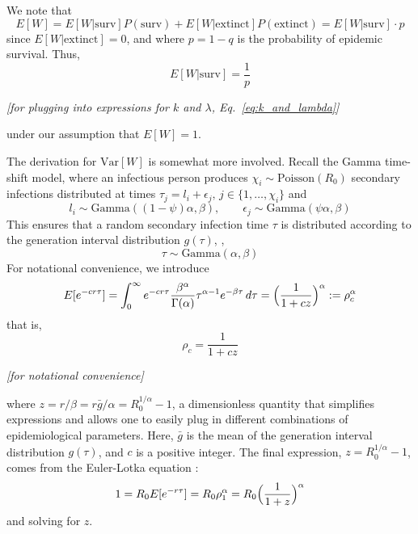  We note that 
\begin{equation}
E[W] = E[W|\text{surv}] P(\text{surv}) + E[W|\text{extinct}] P(\text{extinct}) = E[W | \text{surv}] \cdot p
\label{eq:p_explanation}
\end{equation}
since $E[W|\text{extinct}] = 0$, and where $p = 1-q$ is the probability of epidemic survival. Thus,
\begin{equation}
\boxed{E[W|\text{surv}] = \frac{1}{p}}
\end{equation}
\begin{center}
{\it [for plugging into expressions for $k$ and $\lambda$, Eq.~\ref{eq:k_and_lambda}]} \\ 
\end{center} 
under our assumption that $E[W] = 1$. 

 The derivation for $\text{Var}[W]$ is somewhat more involved. Recall the Gamma time-shift model, where an infectious person produces $\chi_i \sim \text{Poisson}(R_0)$ secondary infections distributed at times $\tau_j = l_i+ \epsilon_j,\, j\in \{1, \dots, \chi_i\}$ and 
\begin{equation}
l_i \sim \text{Gamma}((1-\psi) \alpha, \beta), \qquad \epsilon_j \sim \text{Gamma}(\psi \alpha, \beta)
\end{equation}
This ensures that a random secondary infection time $\tau$ is distributed according to the generation interval distribution $g(\tau)$, \ie,
\begin{equation}
	\tau \sim \text{Gamma}(\alpha, \beta)
\end{equation}
For notational convenience, we introduce 
\begin{equation}
	E[e^{-c r \tau}] = \int_0^\infty e^{-cr\tau} \frac{\beta^\alpha}{\Gamma(\alpha)} \tau^{\alpha-1} e^{-\beta \tau}\, d\tau
	 = \Bigl(\frac{1}{1 + cz}\Bigr)^\alpha := \rho_c^\alpha
\end{equation}
that is, 
\begin{equation}
\boxed{\rho_c = \frac{1}{1+cz}}
\end{equation}
\begin{center}
{\it [for notational convenience]} \\ 
\end{center}
where $z = r/\beta = r \bar{g} / \alpha = R_0^{1/\alpha} - 1$, a dimensionless quantity that simplifies expressions and allows one to easily plug in different combinations of epidemiological parameters. Here, $\bar{g}$ is the mean of the generation interval distribution $g(\tau)$, and $c$ is a positive integer. The final expression, $z = R_0^{1/\alpha} - 1$, comes from the Euler-Lotka equation \citep{wallinga_how_2007}: 
\begin{equation}
1 = R_0 E[e^{-r \tau}] = R_0 \rho_1^\alpha 
= R_0 \Bigl(\frac{1}{1+z}\Bigr)^\alpha
\label{eq:euler_lotka}
\end{equation}
and solving for $z$. 


